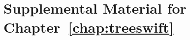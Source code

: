 \chapter{Supplemental Material for Chapter~\ref{chap:treeswift}}
\label{chap:treeswift-sup}
\clearpage

